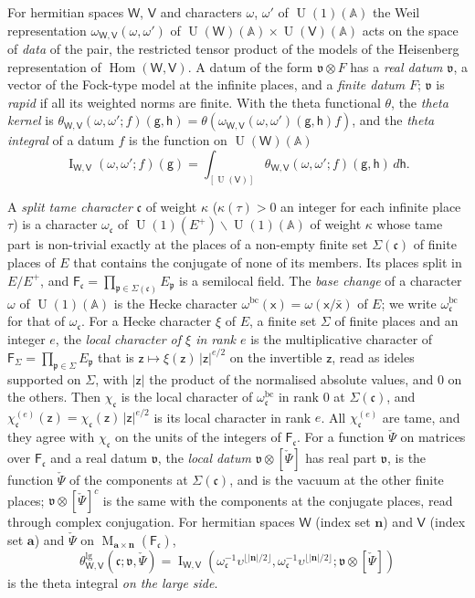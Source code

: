 \documentclass[11pt,a4paper]{article}
\newcommand{\kw}[1]{\emph{#1}}
\theoremstyle{plainx}
\theoremstyle{uprightx}
\newcommand{\dL}{\check{\Psi}}         %
\newcommand{\sF}{\mathsf{F}}
\newcommand{\ba}{\mathbf{a}}
\newcommand{\bn}{\mathbf{n}}
\newcommand{\sW}{\mathsf{W}}
\newcommand{\sV}{\mathsf{V}}
\newcommand{\sg}{\mathsf{g}}
\newcommand{\sh}{\mathsf{h}}
\newcommand{\sz}{\mathsf{z}}
\newcommand{\fc}{\mathfrak{c}}
\newcommand{\fp}{\mathfrak{p}}
\newcommand{\fv}{\mathfrak{v}}
\newcommand{\A}{\mathbb{A}}
\newcommand{\U}{\operatorname{U}}
\newcommand{\Mat}[2]{\operatorname{M}_{#1\times#2}}
\newcommand{\thL}[5]{\theta^{\mathrm{lg}}_{#1,#2}(#3;#4,#5)}
\newcommand{\thI}[5]{\operatorname{I}_{#1,#2}(#3,#4;#5)}
\newcommand{\loc}[2]{#1\otimes#2}
\begin{document}
For hermitian spaces $\sW$, $\sV$ and characters $\omega$, $\omega'$ of $\U(1)(\A)$ the Weil representation
$\omega_{\sW,\sV}(\omega,\omega')$ of $\U(\sW)(\A)\times\U(\sV)(\A)$ acts on the space of \kw{data} of the pair, the
restricted tensor product of the models of the Heisenberg representation of $\operatorname{Hom}(\sW,\sV)$. A datum
of the form $\fv\otimes F$ has a \kw{real datum} $\fv$, a vector of the Fock-type model at the infinite places, and
a \kw{finite datum} $F$; $\fv$ is \kw{rapid} if all its weighted norms are finite. With the theta functional
$\theta$, the \kw{theta kernel} is $\theta_{\sW,\sV}(\omega,\omega';f)(\sg,\sh)=\theta(\omega_{\sW,\sV}(\omega,\omega')(\sg,\sh)f)$,
and the \kw{theta integral} of a datum $f$ is the function on $\U(\sW)(\A)$
\[\thI{\sW}{\sV}{\omega}{\omega'}{f}(\sg)=\int_{[\U(\sV)]}\theta_{\sW,\sV}(\omega,\omega';f)(\sg,\sh)\,d\sh.\]

A \kw{split tame character} $\fc$ of weight $\kappa$ ($\kappa(\tau)>0$ an integer for each infinite place $\tau$) is a
character $\omega_{\fc}$ of $\U(1)(E^{+})\backslash\U(1)(\A)$ of weight $\kappa$ whose tame part is non-trivial exactly
at the places of a non-empty finite set $\Sigma(\fc)$ of finite places of $E$ that contains the conjugate of none of
its members. Its places split in $E/E^{+}$, and $\sF_{\fc}=\prod_{\fp\in\Sigma(\fc)}E_{\fp}$ is a semilocal field.
The \kw{base change} of a character $\omega$ of $\U(1)(\A)$ is the Hecke character
$\omega^{\mathrm{bc}}(\mathsf{x})=\omega(\mathsf{x}/\bar{\mathsf{x}})$ of $E$; we write $\omega^{\mathrm{bc}}_{\fc}$ for
that of $\omega_{\fc}$. For a Hecke character $\xi$ of $E$, a finite set $\Sigma$ of finite places and an integer
$e$, the \kw{local character of $\xi$ in rank $e$} is the multiplicative character of $\sF_\Sigma=\prod_{\fp\in\Sigma}E_{\fp}$
that is $\sz\mapsto\xi(\sz)\,|\sz|^{e/2}$ on the invertible $\sz$, read as ideles supported on
$\Sigma$, with $|\sz|$ the product of the normalised absolute values, and $0$ on the others. Then
$\chi_{\fc}$ is the local character of $\omega^{\mathrm{bc}}_{\fc}$ in rank $0$ at $\Sigma(\fc)$, and
$\chi^{(e)}_{\fc}(\sz)=\chi_{\fc}(\sz)\,|\sz|^{e/2}$ is its local character in rank $e$. All
$\chi^{(e)}_{\fc}$ are tame, and they agree with $\chi_{\fc}$ on the units of the integers of $\sF_{\fc}$. For
a function $\dL$ on matrices over $\sF_{\fc}$ and a real datum $\fv$, the \kw{local datum} $\loc{\fv}{[\dL]}$ has
real part $\fv$, is the function $\dL$ of the components at $\Sigma(\fc)$, and is the vacuum at the other finite
places; $\loc{\fv}{[\dL]^{c}}$ is the same with the components at the conjugate places, read through complex
conjugation. For hermitian spaces $\sW$ (index set $\bn$) and $\sV$ (index set $\ba$) and $\dL$ on
$\Mat{\ba}{\bn}(\sF_{\fc})$,
\[\thL{\sW}{\sV}{\fc}{\fv}{\dL}=\thI{\sW}{\sV}{\omega_{\fc}^{-1}\upsilon^{\lfloor|\bn|/2\rfloor}}{\omega_{\fc}^{-1}\upsilon^{\lfloor|\bn|/2\rfloor}}{\loc{\fv}{[\dL]}}\]
is the theta integral \kw{on the large side}.
\end{document}
